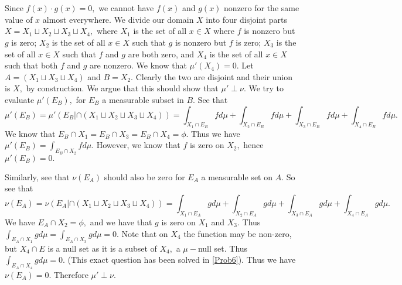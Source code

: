 \documentclass{article}
\begin{document}
\section{} %
Since $f(x)\cdot g(x)=0,$ we cannot have $f(x)$ and $g(x)$ nonzero for the same value of $x$ almost everywhere. We divide our domain $X$ into four disjoint parts $X=X_1 \sqcup X_2 \sqcup X_3 \sqcup X_4,$ where $X_1$ is the set of all $x \in X$ where $f$ is nonzero but $g$ is zero; $X_2$ is the set of all $x \in X$ such that $g$ is nonzero but $f$ is zero; $X_3$ is the set of all $x \in X$ such that $f$ and $g$ are both zero, and $X_4$ is the set of all $x \in X$ such that both $f$ and $g$ are nonzero. We know that $\mu'(X_4)=0.$ Let $A= (X_1 \sqcup X_3 \sqcup X_4)$ and $B=X_2.$ Clearly the two are disjoint and their union is $X,$ by construction. We argue that this should show that $\mu' \perp \nu.$ We try to evaluate $\mu'(E_B),$ for $E_B$ a measurable subset in $B.$ See that $$ \mu'(E_B)=\mu'(E_B|\cap (X_1 \sqcup X_2 \sqcup X_3 \sqcup X_4))=\int_{X_1 \cap E_B}f d\mu + \int_{X_2 \cap E_B}f d\mu +\int_{X_3 \cap E_B}f d\mu +\int_{X_4 \cap E_B}f d\mu.$$ We know that $E_B \cap X_1=E_B \cap X_3=E_B \cap X_4=\phi.$ Thus we have $\mu'(E_B)= \int_{E_B \cap X_2}f d\mu.$ However, we know that $f$ is zero on $X_2,$ hence $\mu'(E_B)=0.$ 

Similarly, see that $\nu(E_A)$ should also be zero for $E_A$ a measurable set on $A$. So see that$$\nu(E_A)=\nu(E_A|\cap(X_1 \sqcup X_2 \sqcup X_3 \sqcup X_4))=\int_{X_1 \cap E_A}g d\mu + \int_{X_2 \cap E_A}g d\mu +\int_{X_3 \cap E_A}g d\mu +\int_{X_4 \cap E_A}g d\mu.$$ We have $E_A \cap X_2=\phi,$ and we have that $g$ is zero on $X_1$ and $X_3.$ Thus $\int_{E_A \cap X_1}g d\mu=\int_{E_A \cap X_3}g d\mu=0.$ Note that on $X_4$ the function may be non-zero, but $X_4 \cap E$ is a null set as it is a subset of $X_4,$ a $\mu-$null set. Thus $\int_{E_A \cap X_4}g d\mu =0.$ (This exact question has been solved in \ref{Prob6}). Thus we have $\nu(E_A)=0.$ Therefore $\mu' \perp \nu.$ 
\end{document}
